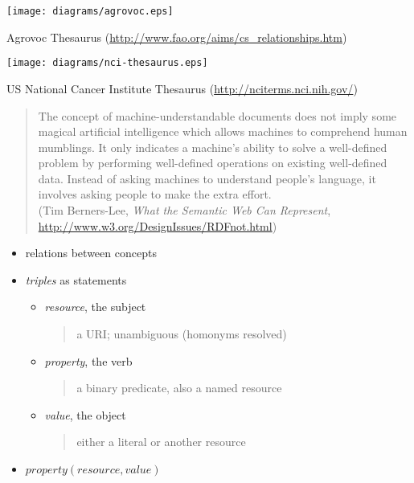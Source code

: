\documentclass{sepslide-soa-faked} %
\begin{document}
\begin{slide}
\begin{flushleft}
\texttt{[image: diagrams/agrovoc.eps]}
\end{flushleft}
Agrovoc Thesaurus (\url{http://www.fao.org/aims/cs_relationships.htm})
\end{slide}

\begin{slide}
\begin{flushleft}
\texttt{[image: diagrams/nci-thesaurus.eps]}
\end{flushleft}
US National Cancer Institute Thesaurus (\url{http://nciterms.nci.nih.gov/})
\end{slide}

\begin{slide}
\begin{quote}
{\sffamily
The concept of machine-understandable documents does not imply some magical artificial intelligence which allows machines to comprehend human mumblings. It only indicates a machine's ability to solve a well-defined problem by performing well-defined operations on existing well-defined data. Instead of asking machines to understand people's language, it involves asking people to make the extra effort.
} \medskip \\
(Tim Berners-Lee, \textit{What the Semantic Web Can Represent}, \url{http://www.w3.org/DesignIssues/RDFnot.html})
\end{quote}
\end{slide}

\begin{slide}
\begin{itemize}
\item relations between concepts
\item \emph{triples} as statements
  \begin{itemize}
  \item \emph{resource}, the subject 
  \begin{quote}
  a URI; unambiguous (homonyms resolved)
  \end{quote}
  \item \emph{property}, the verb
  \begin{quote}
  a binary predicate, also a named resource
  \end{quote}
  \item \emph{value}, the object
  \begin{quote}
  either a literal or another resource
  \end{quote}
  \end{itemize}
\item $property(resource, value)$
\end{itemize}
\end{slide}
\end{document}
